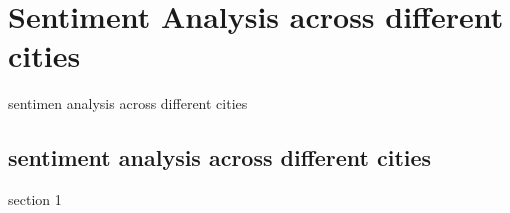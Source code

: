\chapter{Sentiment Analysis across different cities}
sentimen analysis across different cities
\section{sentiment analysis across different cities}
section 1
